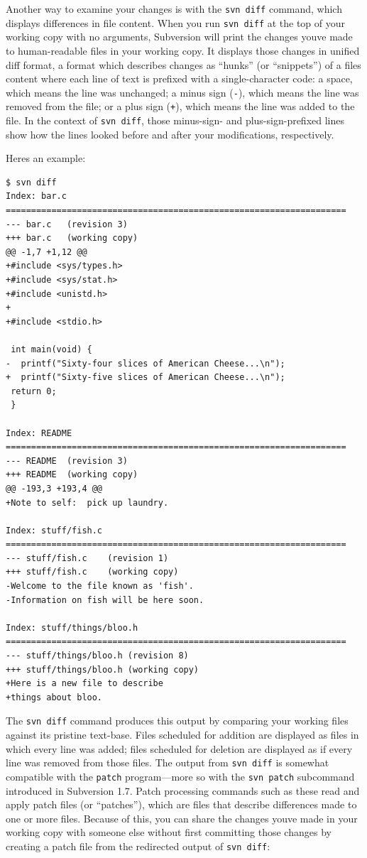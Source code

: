 Another way to examine your changes is with the \texttt{svn\ diff}
command, which displays differences in file content. When you run
\texttt{svn\ diff} at the top of your working copy with no arguments,
Subversion will print the changes you\textquotesingle ve made to
human-readable files in your working copy. It displays those changes in
unified diff format, a format which describes changes as ``hunks'' (or
``snippets'') of a file\textquotesingle s content where each line of
text is prefixed with a single-character code: a space, which means the
line was unchanged; a minus sign (\texttt{-}), which means the line was
removed from the file; or a plus sign (\texttt{+}), which means the line
was added to the file. In the context of \texttt{svn\ diff}, those
minus-sign- and plus-sign-prefixed lines show how the lines looked
before and after your modifications, respectively.

Here\textquotesingle s an example:

\begin{verbatim}
$ svn diff
Index: bar.c
===================================================================
--- bar.c   (revision 3)
+++ bar.c   (working copy)
@@ -1,7 +1,12 @@
+#include <sys/types.h>
+#include <sys/stat.h>
+#include <unistd.h>
+
+#include <stdio.h>

 int main(void) {
-  printf("Sixty-four slices of American Cheese...\n");
+  printf("Sixty-five slices of American Cheese...\n");
 return 0;
 }

Index: README
===================================================================
--- README  (revision 3)
+++ README  (working copy)
@@ -193,3 +193,4 @@
+Note to self:  pick up laundry.

Index: stuff/fish.c
===================================================================
--- stuff/fish.c    (revision 1)
+++ stuff/fish.c    (working copy)
-Welcome to the file known as 'fish'.
-Information on fish will be here soon.

Index: stuff/things/bloo.h
===================================================================
--- stuff/things/bloo.h (revision 8)
+++ stuff/things/bloo.h (working copy)
+Here is a new file to describe
+things about bloo.
\end{verbatim}

The \texttt{svn\ diff} command produces this output by comparing your
working files against its pristine text-base. Files scheduled for
addition are displayed as files in which every line was added; files
scheduled for deletion are displayed as if every line was removed from
those files. The output from \texttt{svn\ diff} is somewhat compatible
with the \texttt{patch} program---more so with the \texttt{svn\ patch}
subcommand introduced in Subversion 1.7. Patch processing commands such
as these read and apply patch files (or ``patches''), which are files
that describe differences made to one or more files. Because of this,
you can share the changes you\textquotesingle ve made in your working
copy with someone else without first committing those changes by
creating a patch file from the redirected output of \texttt{svn\ diff}:

